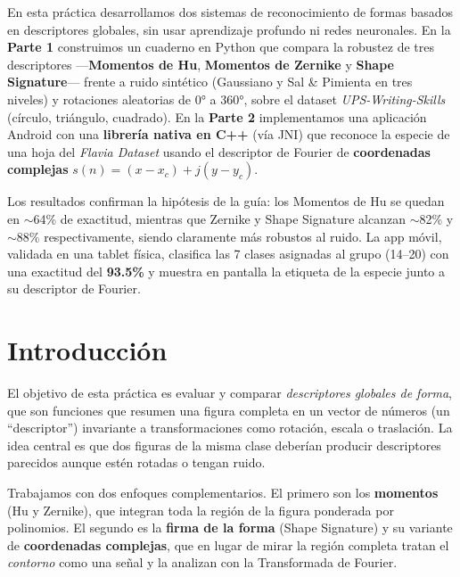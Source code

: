 \documentclass[12pt,a4paper]{article}
\begin{document}
En esta práctica desarrollamos dos sistemas de reconocimiento de formas basados en descriptores globales, sin usar aprendizaje profundo ni redes neuronales. En la \textbf{Parte 1} construimos un cuaderno en Python que compara la robustez de tres descriptores —\textbf{Momentos de Hu}, \textbf{Momentos de Zernike} y \textbf{Shape Signature}— frente a ruido sintético (Gaussiano y Sal \& Pimienta en tres niveles) y rotaciones aleatorias de 0° a 360°, sobre el dataset \textit{UPS-Writing-Skills} (círculo, triángulo, cuadrado). En la \textbf{Parte 2} implementamos una aplicación Android con una \textbf{librería nativa en C++} (vía JNI) que reconoce la especie de una hoja del \textit{Flavia Dataset} usando el descriptor de Fourier de \textbf{coordenadas complejas} $s(n)=(x-x_c)+j(y-y_c)$.

Los resultados confirman la hipótesis de la guía: los Momentos de Hu se quedan en $\sim$64\% de exactitud, mientras que Zernike y Shape Signature alcanzan $\sim$82\% y $\sim$88\% respectivamente, siendo claramente más robustos al ruido. La app móvil, validada en una tablet física, clasifica las 7 clases asignadas al grupo (14--20) con una exactitud del \textbf{93.5\%} y muestra en pantalla la etiqueta de la especie junto a su descriptor de Fourier.

\clearpage
\tableofcontents
\clearpage

\section{Introducción}

El objetivo de esta práctica es evaluar y comparar \textit{descriptores globales de forma}, que son funciones que resumen una figura completa en un vector de números (un ``descriptor'') invariante a transformaciones como rotación, escala o traslación. La idea central es que dos figuras de la misma clase deberían producir descriptores parecidos aunque estén rotadas o tengan ruido.

Trabajamos con dos enfoques complementarios. El primero son los \textbf{momentos} (Hu y Zernike), que integran toda la región de la figura ponderada por polinomios. El segundo es la \textbf{firma de la forma} (Shape Signature) y su variante de \textbf{coordenadas complejas}, que en lugar de mirar la región completa tratan el \textit{contorno} como una señal y la analizan con la Transformada de Fourier.
\end{document}
